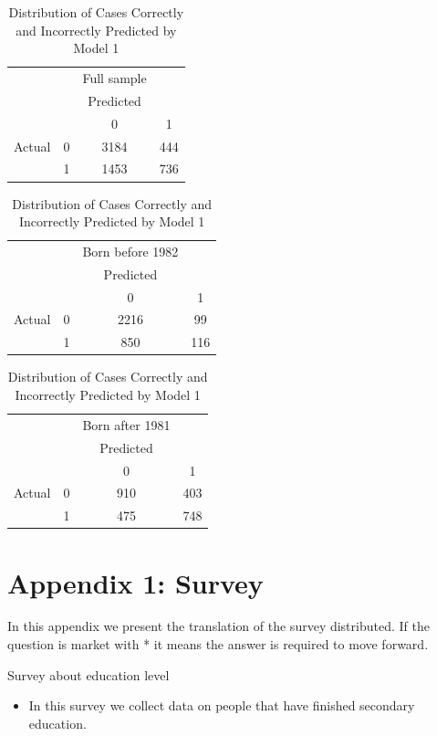 \documentclass[12pt]{article}
\begin{document}
\begin{table}[H]
\caption{Distribution of Cases Correctly and Incorrectly Predicted by Model 1}
\begin{center}
\begin{minipage}{2.5in}
\begin{tabular}{cccc}
&&Full sample&\\
&& Predicted\\
\hline
\hline
&&0&1\\
Actual&0&3184&444\\
&1&1453&736\\
\hline
\end{tabular}
\end{minipage}
\begin{minipage}{2.5in}
\begin{tabular}{cccc}
&&Born before 1982&\\
&& Predicted\\
\hline
\hline
&&0&1\\
Actual&0&2216&99\\
&1&850&116\\
\hline
\end{tabular}
\end{minipage}
\begin{minipage}{2.5in}
\begin{tabular}{cccc}
&&Born after 1981&\\
&& Predicted\\
\hline
\hline
&&0&1\\
Actual&0&910&403\\
&1&475&748\\
\hline
\end{tabular}
\end{minipage}
\end{center}
\label{actual}
\end{table}

\newpage
\section*{Appendix 1: Survey}
In this appendix we present the translation of the survey distributed. If the question is market with * it means the answer is required to move forward.

Survey about education level
\begin{itemize}
\item In this survey we collect data on people that have finished secondary education.
\end{itemize}
\end{document}
